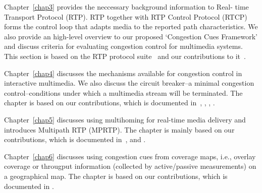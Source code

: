 
Chapter~\ref{chap3} provides the neccessary background information to Real-
time Transport Protocol (RTP). RTP together with RTP Control Protocol (RTCP)
forms the control loop that adapts media to the reported path characteristics.
We also provide an high-level overview to our proposed `Congestion Cues
Framework' and discuss criteria for evaluating congestion control for
multimedia systems. This section is based on the RTP protocol
suite~\cite{rfc3550, rfc4585, rfc3611, rfc5104, rfc5506} and our contributions
to it~\cite{draft.rmcat.evaluate, draft.xr.discard.rle, draft.xr.jb}.


Chapter~\ref{chap4} discusses the mechanisms available for congestion control
in interactive multimedia. We also discuss the circuit breaker--a minimal
congestion control--conditions under which a multimedia stream will be
terminated. The chapter is based on our contributions, which is documented
in~\cite{draft.rtp.cb, Singh:control.loops.api}, ,
, .


Chapter~\ref{chap5} discusses using multihoming for real-time media delivery
and introduces Multipath RTP (MPRTP). The chapter is mainly based on our
contributions, which is documented in~\cite{draft.mprtp, draft.mprtp.sdp,
Globisch:AsymGrpComm, draft.rtcp.overlay}, and .


Chapter~\ref{chap6} discusses using congestion cues from coverage maps, i.e.,
overlay coverage or througput information (collected by active/passive
measurements) on a geographical map. The chapter is based on our
contributions,  which is documented in .

